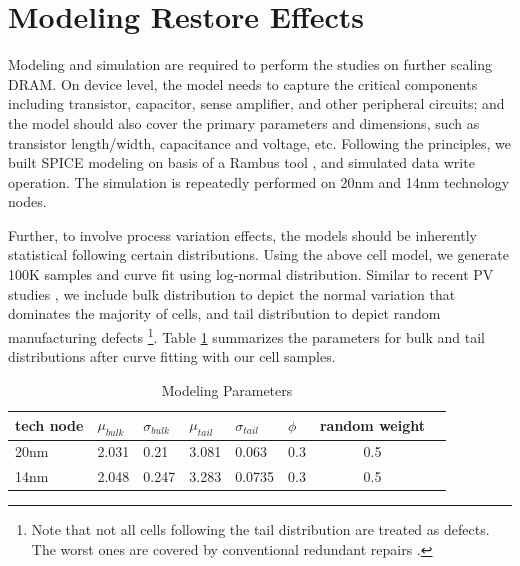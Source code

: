 \section{Modeling Restore Effects}
Modeling and simulation are required to perform the studies on further scaling DRAM. On device level, the model needs to capture the critical components including transistor, capacitor, sense amplifier, and other peripheral circuits; and the model should also cover the primary parameters and dimensions, such as transistor length/width, capacitance and voltage, etc. Following the principles, we built SPICE modeling on basis of a Rambus tool \cite{MICRO10:rambus}, and simulated data write operation. The simulation is repeatedly performed on 20nm and 14nm technology nodes.


Further, to involve process variation effects, the models should be inherently statistical following certain distributions.
Using the above cell model, we generate 100K samples and curve fit using log-normal distribution. Similar to recent PV studies \cite{ISCA12:raidr,HPCA14:mosaic}, we include bulk distribution to depict the normal variation that dominates the majority of cells, and tail distribution to depict random manufacturing defects
{\footnote{Note that not all cells following the tail distribution are treated as defects. The worst ones are covered by conventional redundant repairs \cite{HPCA14:mosaic}.}}.
Table \ref{tab:tech} summarizes the parameters for bulk and tail distributions after curve fitting with our cell samples. 

\vspace{-0.3in}
\begin{table}[htbp]
\caption{Modeling Parameters}
\vspace{-0.25in}
\centering
\scalebox{0.85}
{
\begin{tabular}{l|llll|lcc}
\hline
tech node&	$\mu_{bulk}$&	$\sigma_{bulk}$&	$\mu_{tail}$&	$\sigma_{tail}$&	$\phi$&	random weight\\
\hline\hline
20nm&	2.031&	0.21&	3.081&	0.063&		0.3	&0.5\\
14nm&	2.048&	0.247&	3.283&	0.0735&	0.3	&0.5\\
\hline\hline
\end{tabular}
}
\label{tab:tech}
\end{table}


